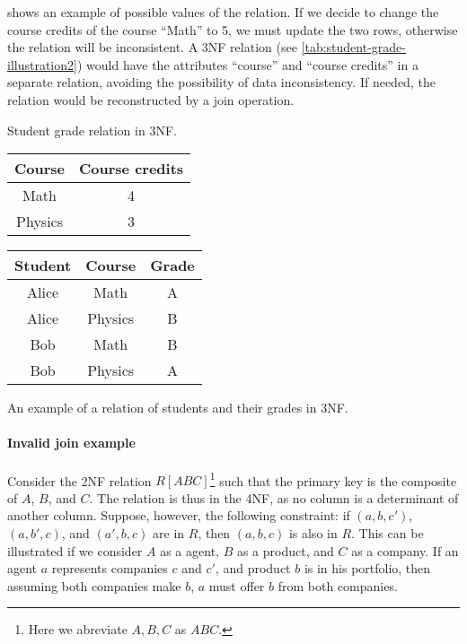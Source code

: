  shows an example of possible values of the relation.
If we decide to change the course credits of the course ``Math'' to 5, we must update the
two rows, otherwise the relation will be inconsistent.  A 3NF relation (see
\cref{tab:student-grade-illustration2}) would have the attributes ``course'' and ``course
credits'' in a separate relation, avoiding the possibility of data inconsistency.  If
needed, the relation would be reconstructed by a join operation.

\begin{tablebox}[label=tab:student-grade-illustration2]{Student grade relation in 3NF.}
  \centering
  \begin{tabular}{cc}
    \toprule
    \textbf{Course} & \textbf{Course credits} \\
    \midrule
    Math & 4 \\
    Physics & 3 \\
    \bottomrule
  \end{tabular}
  \quad
  \begin{tabular}{ccc}
    \toprule
    \textbf{Student} & \textbf{Course} & \textbf{Grade} \\
    \midrule
    Alice & Math & A \\
    Alice & Physics & B \\
    Bob & Math & B \\
    Bob & Physics & A \\
    \bottomrule
  \end{tabular}
  \tcblower
  An example of a relation of students and their grades in 3NF.
\end{tablebox}

\paragraph{Invalid join example} Consider the 2NF relation $R[ABC]$\footnote{Here we abreviate ${A,
B, C}$ as $ABC$.} such that the primary key is the composite of $A$, $B$, and $C$.  The
relation is thus in the 4NF, as no column is a determinant of another column.  Suppose,
however, the following constraint: if $(a, b, c')$, $(a, b', c)$, and $(a', b, c)$ are in
$R$, then $(a, b, c)$ is also in $R$.  This can be illustrated if we consider $A$ as a
agent, $B$ as a product, and $C$ as a company.  If an agent $a$ represents companies $c$ and
$c'$, and product $b$ is in his portfolio, then assuming both companies make $b$, $a$
must offer $b$ from both companies.

